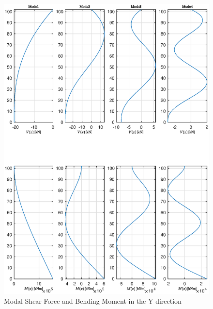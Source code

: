 \documentclass[11pt,a4paper,titlepage]{report}
\makeatletter
\renewcommand\paragraph{\@startsection{paragraph}{5}{\z@}%
  {3.25ex \@plus1ex \@minus.2ex}%
  {-1em}%
  {\normalfont\normalsize\bfseries}}
\makeatother
\begin{document}
\begin{figure} [h]
    \centering
    \includegraphics[width=16cm]{Modal_Section_Forces_Y.eps}
    \caption{Modal Shear Force and Bending Moment in the Y direction}
    \label{fig:I.2 - HR Shear force and bending moment Y}
\end{figure}
\end{document}
